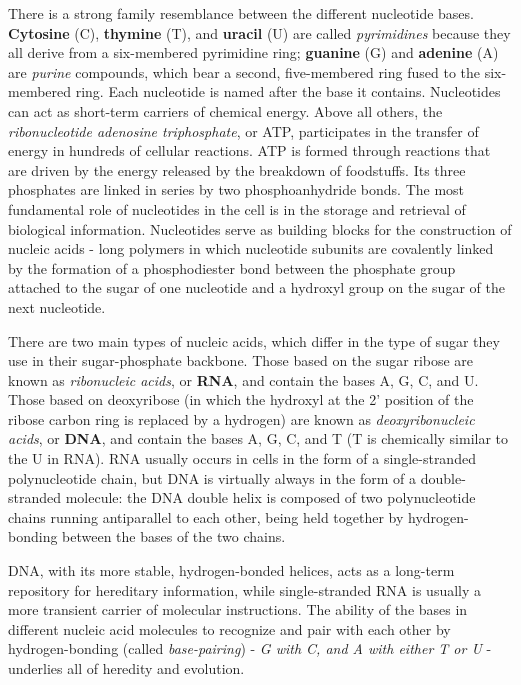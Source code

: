 There is a strong family resemblance between the different nucleotide
bases. \textbf{Cytosine} (C), \textbf{thymine} (T), and \textbf{uracil} (U) are called \textit{pyrimidines}
because they all derive from a six-membered pyrimidine ring; \textbf{guanine} (G)
and \textbf{adenine} (A) are \textit{purine} compounds, which bear a second, five-membered
ring fused to the six-membered ring. Each nucleotide is named
after the base it contains.
Nucleotides can act as short-term carriers of chemical energy. Above all
others, the \textit{ribonucleotide adenosine triphosphate}, or ATP,
participates in the transfer of energy in hundreds of cellular reactions.
ATP is formed through reactions that are driven by the energy released by
the breakdown of foodstuffs. Its three phosphates are linked in series by
two phosphoanhydride bonds.
The most fundamental role of nucleotides in the cell is in the storage and
retrieval of biological information. Nucleotides serve as building blocks
for the construction of nucleic acids - long polymers in which nucleotide
subunits are covalently linked by the formation of a phosphodiester bond
between the phosphate group attached to the sugar of one nucleotide
and a hydroxyl group on the sugar of the next nucleotide.

There are two main types of nucleic acids, which differ in the type of
sugar they use in their sugar-phosphate backbone. Those based on the
sugar ribose are known as \textit{ribonucleic acids}, or \textbf{RNA}, and contain the
bases A, G, C, and U. Those based on deoxyribose (in which the hydroxyl
at the 2' position of the ribose carbon ring is replaced by a hydrogen)
are known as \textit{deoxyribonucleic acids}, or \textbf{DNA}, and contain the bases A, G, C, and T
(T is chemically similar to the U in RNA).
RNA usually occurs in cells in the form of a single-stranded polynucleotide chain,
but DNA is virtually always in the form
of a double-stranded molecule: the DNA double helix is composed of
two polynucleotide chains running antiparallel to each other, being held
together by hydrogen-bonding between the bases of the two chains.

DNA, with its more stable, hydrogen-bonded
helices, acts as a long-term repository for hereditary information, while
single-stranded RNA is usually a more transient carrier of molecular
instructions. The ability of the bases in different nucleic acid molecules
to recognize and pair with each other by hydrogen-bonding (called \textit{base-pairing})
- \textit{G with C, and A with either T or U} - underlies all of heredity and
evolution.

